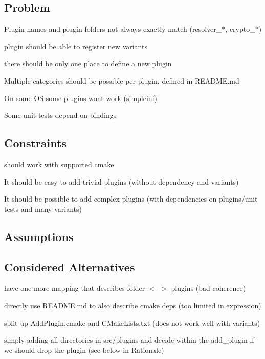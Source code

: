 \subsection*{Problem}


\begin{DoxyItemize}
\item Plugin names and plugin folders not always exactly match ({\ttfamily resolver\+\_\+$\ast$}, {\ttfamily crypto\+\_\+$\ast$})
\item plugin should be able to register new variants
\item there should be only one place to define a new plugin
\item Multiple categories should be possible per plugin, defined in R\+E\+A\+D\+M\+E.\+md
\item On some OS some plugins won\textquotesingle{}t work (simpleini)
\item Some unit tests depend on bindings
\end{DoxyItemize}

\subsection*{Constraints}


\begin{DoxyItemize}
\item should work with supported cmake
\item It should be easy to add trivial plugins (without dependency and variants)
\item It should be possible to add complex plugins (with dependencies on plugins/unit tests and many variants)
\end{DoxyItemize}

\subsection*{Assumptions}

\subsection*{Considered Alternatives}


\begin{DoxyItemize}
\item have one more mapping that describes folder $<$-\/$>$ plugins (bad coherence)
\item directly use R\+E\+A\+D\+M\+E.\+md to also describe cmake deps (too limited in expression)
\item split up Add\+Plugin.\+cmake and C\+Make\+Lists.\+txt (does not work well with variants)
\item simply adding all directories in src/plugins and decide within the {\ttfamily add\+\_\+plugin} if we should drop the plugin (see below in Rationale)
\end{DoxyItemize}

